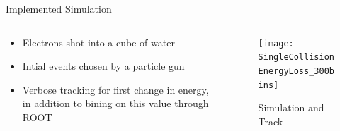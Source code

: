 \documentclass[compress]{beamer}
\begin{document}
\begin{frame}[fragile]{Implemented Simulation}
  \begin{columns}[onlytextwidth]
    \begin{column}{0.45\textwidth}
      \begin{itemize}
         \item Electrons shot into a cube of water
         \item Intial events chosen by a particle gun
         \item Verbose tracking for first change in energy, in addition to bining on this value through ROOT
      \end{itemize}
    \end{column}
    \begin{column}{0.45\textwidth}
      \begin{figure}
        \texttt{[image: SingleCollisionEnergyLoss\_300bins]}
        \caption{Simulation and Track}
    \end{figure}
    \end{column}
  \end{columns}
\end{frame}
\end{document}
